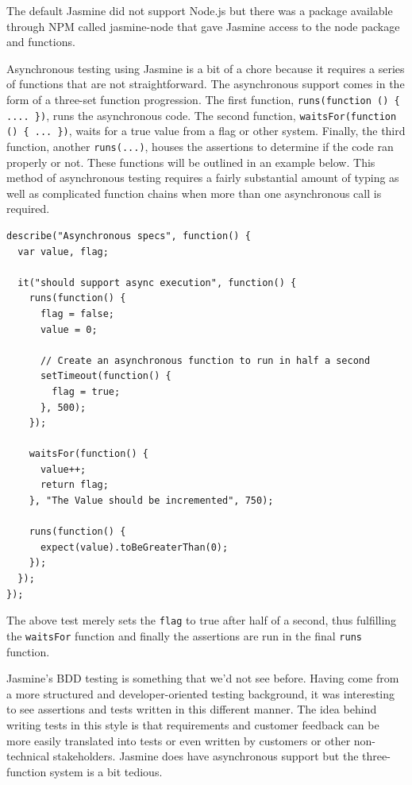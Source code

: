 \documentclass[12pt]{ucthesis}
\begin{document}
The default Jasmine did not support Node.js but there was a package available through NPM called jasmine-node \cite{JasmineNode} that gave Jasmine access to the node package and functions. 

Asynchronous testing using Jasmine is a bit of a chore because it requires a series of functions that are not straightforward. The asynchronous support comes in the form of a three-set function progression. The first function, \lstinline!runs(function () { .... })!, runs the asynchronous code. The second function, \lstinline!waitsFor(function () { ... })!, waits for a true value from a flag or other system. Finally, the third function, another \lstinline{runs(...)}, houses the assertions to determine if the code ran properly or not. These functions will be outlined in an example below. This method of asynchronous testing requires a fairly substantial amount of typing as well as complicated function chains when more than one asynchronous call is required.

\begin{lstlisting}
describe("Asynchronous specs", function() {
  var value, flag;

  it("should support async execution", function() {
    runs(function() {
      flag = false;
      value = 0;

      // Create an asynchronous function to run in half a second
      setTimeout(function() {
        flag = true;
      }, 500);
    });

    waitsFor(function() {
      value++;
      return flag;
    }, "The Value should be incremented", 750);

    runs(function() {
      expect(value).toBeGreaterThan(0);
    });
  });
});
\end{lstlisting}

The above test merely sets the \lstinline{flag} to true after half of a second, thus fulfilling the \lstinline{waitsFor} function and finally the assertions are run in the final \lstinline{runs} function.

Jasmine's BDD testing is something that we'd not see before. Having come from a more structured and developer-oriented testing background, it was interesting to see assertions and tests written in this different manner. The idea behind writing tests in this style is that requirements and customer feedback can be more easily translated into tests or even written by customers or other non-technical stakeholders. Jasmine does have asynchronous support but the three-function system is a bit tedious.
\end{document}
